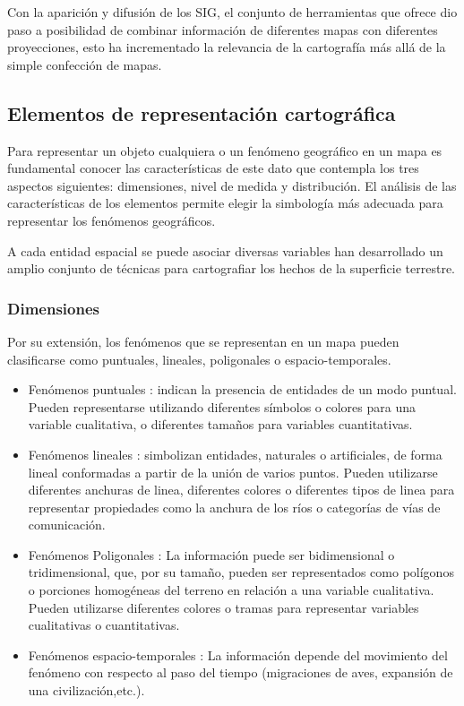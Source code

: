Con la aparición y difusión de los SIG, el conjunto de herramientas que ofrece dio paso a posibilidad de combinar
información de diferentes mapas con diferentes proyecciones, esto ha incrementado la relevancia de la cartografía 
más allá de la simple confección de mapas.

\subsection{Elementos de representación cartográfica}
Para representar un objeto cualquiera o un fenómeno geográfico en un mapa es fundamental conocer las
características de este dato que contempla los tres aspectos siguientes: dimensiones, nivel de medida y
distribución. El análisis de las características de los elementos permite elegir la simbología más adecuada para
representar los fenómenos geográficos.
 
A cada entidad espacial se puede asociar diversas variables han desarrollado un amplio conjunto de técnicas para
cartografiar los hechos de la superficie terrestre.

\subsubsection{Dimensiones}
Por su extensión, los fenómenos que se representan en un mapa pueden clasificarse como puntuales, lineales,
poligonales o espacio-temporales.

\begin{itemize}
    \item Fenómenos puntuales : indican la presencia de entidades de un modo puntual. Pueden representarse
    utilizando diferentes símbolos o colores para una variable cualitativa, o diferentes tamaños para variables
    cuantitativas.
    
    \item Fenómenos lineales : simbolizan entidades, naturales o artificiales, de forma lineal conformadas a
    partir de la unión de varios puntos. Pueden utilizarse diferentes anchuras de linea, diferentes colores o
    diferentes tipos de linea para representar propiedades como la anchura de los ríos o categorías de vías de
    comunicación.
        
    \item Fenómenos Poligonales : La información puede ser bidimensional o tridimensional, que, por su tamaño,
    pueden ser representados como polígonos o porciones homogéneas del terreno en relación a una variable
    cualitativa. Pueden utilizarse diferentes colores o tramas para representar variables cualitativas o
    cuantitativas.

    \item Fenómenos espacio-temporales : La información depende del movimiento del fenómeno con respecto al paso
    del tiempo (migraciones de aves, expansión de una civilización,etc.).
\end{itemize}

